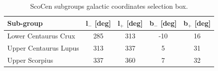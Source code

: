 \begin{table}[]
\centering
\caption{\scriptsize{ScoCen subgroups galactic coordinates selection box.}}
\label{tab:ScoCen_SpatialDist}
\begin{tabular}{lcccc}
\hline
Sub-group             & l$_{-}$ {[}deg{]} & l$_{+}$ {[}deg{]} & b$_{-}$ {[}deg{]} & b$_{+}$ {[}deg{]} \\ \hline \hline
Lower Centaurus Crux  & 285               & 313               & -10               & 16                \\
Upper Centaurus Lupus & 313               & 337               & 5                 & 31                \\
Upper Scorpius        & 337               & 360               & 7                 & 32                \\ \hline \hline
\end{tabular}
\end{table}

